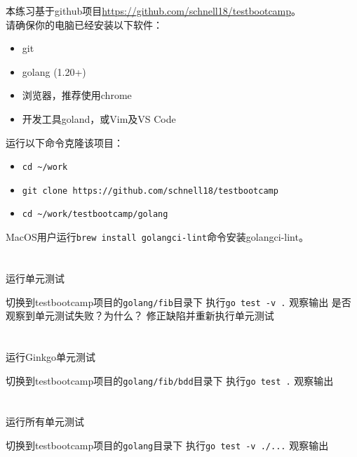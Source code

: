 \documentclass[12pt,addpoints,fleqn]{exam}
\begin{document}
\begin{questions}
\begin{parts}
本练习基于github项目\href{https://github.com/schnell18/testbootcamp}{https://github.com/schnell18/testbootcamp}。\\
请确保你的电脑已经安装以下软件：

\begin{itemize}
    \item git
    \item golang (1.20+)
    \item 浏览器，推荐使用chrome
    \item 开发工具goland，或Vim及VS Code
\end{itemize}

运行以下命令克隆该项目：
\begin{itemize}
    \item \verb=cd ~/work=
    \item \verb=git clone https://github.com/schnell18/testbootcamp=
    \item \verb=cd ~/work/testbootcamp/golang=
\end{itemize}

MacOS用户运行\verb=brew install golangci-lint=命令安装golangci-lint。

  \part{}运行单元测试
  \begin{subparts}
    \subpart{}切换到testbootcamp项目的\verb=golang/fib=目录下
    \subpart{}执行\verb=go test -v .=
    \subpart{}观察输出
    \fillwithdottedlines{1in}
    \subpart{}是否观察到单元测试失败？为什么？
    \subpart{}修正缺陷并重新执行单元测试
  \end{subparts}

  \part{}运行Ginkgo单元测试
  \begin{subparts}
    \subpart{}切换到testbootcamp项目的\verb=golang/fib/bdd=目录下
    \subpart{}执行\verb=go test .=
    \subpart{}观察输出
    \fillwithdottedlines{1in}
  \end{subparts}

  \part{}运行所有单元测试
  \begin{subparts}
    \subpart{}切换到testbootcamp项目的\verb=golang=目录下
    \subpart{}执行\verb=go test -v ./...=
    \subpart{}观察输出
    \fillwithdottedlines{1in}
  \end{subparts}


\end{parts}
\end{questions}
\end{document}
